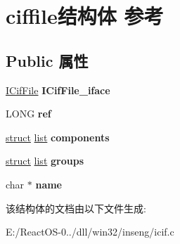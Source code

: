 \hypertarget{structciffile}{}\section{ciffile结构体 参考}
\label{structciffile}
\subsection*{Public 属性}
\begin{DoxyCompactItemize}
\item 
\mbox{\label{structciffile_a804143d9f5ba9b873f996b2e867202c4}} 
\hyperlink{interface_i_cif_file}{I\+Cif\+File} {\bfseries I\+Cif\+File\+\_\+iface}
\item 
\mbox{\label{structciffile_a405bb47a6c2dc1728b98e8b308387e32}} 
L\+O\+NG {\bfseries ref}
\item 
\mbox{\label{structciffile_a3acdfe2e7d55935ea675d91a96fd89d8}} 
\hyperlink{interfacestruct}{struct} \hyperlink{classlist}{list} {\bfseries components}
\item 
\mbox{\label{structciffile_a775e2968a054d19ace1961ba285067e0}} 
\hyperlink{interfacestruct}{struct} \hyperlink{classlist}{list} {\bfseries groups}
\item 
\mbox{\label{structciffile_a2797055acdc41a898a79df7bca657372}} 
char $\ast$ {\bfseries name}
\end{DoxyCompactItemize}


该结构体的文档由以下文件生成\+:\begin{DoxyCompactItemize}
\item 
E\+:/\+React\+O\+S-\/0../dll/win32/inseng/icif.\+c\end{DoxyCompactItemize}
